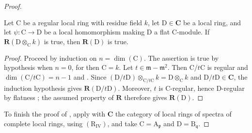 \begin{proof}
\begin{lemma}[7.5.1.1]
Let $\mathrm{C}$ be a regular local ring with residue field $k$, let $\mathrm{D}\in\boldsymbol{C}$ be a local ring, and let $\psi:\mathrm{C}\to\mathrm{D}$ be a local homomorphism making $\mathrm{D}$ a flat $\mathrm{C}$-module. If $\boldsymbol{R}(\mathrm{D}\otimes_\mathrm{C}k)$ is true, then $\boldsymbol{R}(\mathrm{D})$ is true.
\end{lemma}

\begin{proof}
Proceed by induction on $n=\dim(\mathrm{C})$. The assertion is true by hypothesis when $n=0$, for then $\mathrm{C}=k$. Let $t\in\mathfrak{m}-\mathfrak{m}^2$. Then $\mathrm{C}/t\mathrm{C}$ is regular and $\dim(\mathrm{C}/t\mathrm{C})=n-1$  and . Since $(\mathrm{D}/t\mathrm{D})\otimes_{\mathrm{C}/t\mathrm{C}}k
=\mathrm{D}\otimes_\mathrm{C}k$
and $\mathrm{D}/t\mathrm{D}\in\boldsymbol{C}$, the induction hypothesis gives $\boldsymbol{R}(\mathrm{D}/t\mathrm{D})$. Moreover, $t$ is $\mathrm{C}$-regular, hence $\mathrm{D}$-regular by flatness ; the assumed property of $\boldsymbol{R}$ therefore gives $\boldsymbol{R}(\mathrm{D})$.
\end{proof}

To finish the proof of , apply  with $\boldsymbol{C}$ the category of local rings of spectra of complete local rings, using $(\mathrm{R}_{\mathrm{IV}})$, and take $\mathrm{C}=\mathrm{A}_\mathfrak{p}$ and $\mathrm{D}=\mathrm{B}_\mathfrak{q}$.
\end{proof}

